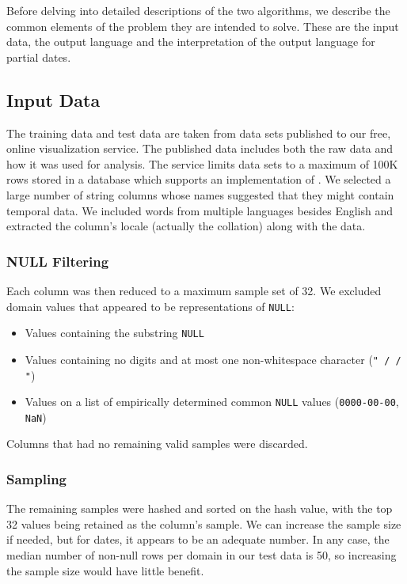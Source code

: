 Before delving into detailed descriptions of the two algorithms, we describe the common elements of the problem they are intended to solve. These are the input data, the output language and the interpretation of the output language for partial dates.

\subsection{Input Data}
The training data and test data are taken from data sets published to our free, online visualization service. The published data includes both the raw data and how it was used for analysis. The service limits data sets to a maximum of 100K rows stored in a database which supports an implementation of \dateparse.  We selected a large number of string columns whose names suggested that they might contain temporal data. We included words from multiple languages besides English and extracted the column's locale (actually the collation) along with the data.

\subsubsection{NULL Filtering}
Each column was then reduced to a maximum sample set of 32. We excluded domain values that appeared to be representations of \texttt{NULL}:
\begin{itemize}
\item Values containing the substring \texttt{NULL}
\item Values containing no digits and at most one non-whitespace character (\eg \texttt{" / / "})
\item Values on a list of empirically determined common \texttt{NULL} values (\eg \texttt{0000-00-00}, \texttt{NaN})
\end{itemize}
Columns that had no remaining valid samples were discarded. 

\subsubsection{Sampling}
The remaining samples were hashed and sorted on the hash value, with the top 32 values being retained as the column's sample. We can increase the sample size if needed, but for dates, it appears to be an adequate number. In any case, the median number of non-null rows per domain in our test data is 50, so increasing the sample size would have little benefit.

